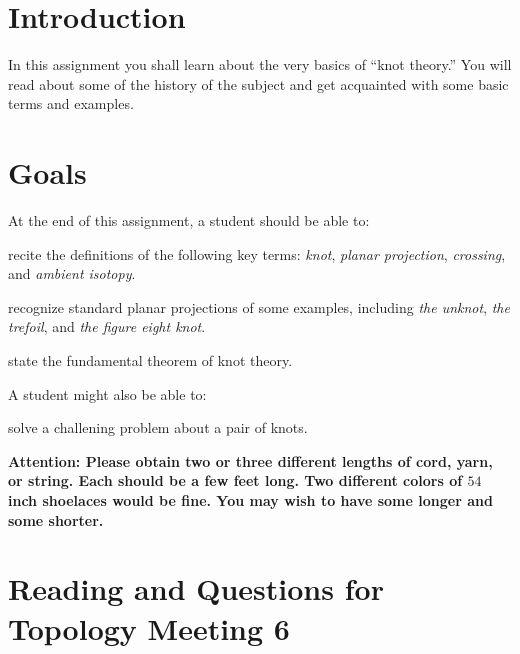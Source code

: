 \documentclass[12pt,letterpaper]{article}
\theoremstyle{definition}
\begin{document}
\setlength{\parskip}{1ex plus 0.5ex minus 0.2ex}
\setlength{\parindent}{0pt}

\pagestyle{fancy}
\cfoot{}

\section*{Introduction}
In this assignment you shall learn about the very basics of ``knot theory.''
You will read about some of the history of the subject and get acquainted with some basic terms and examples.

\section*{Goals}
At the end of this assignment, a student should be able to:
\begin{compactitem}
\item recite the definitions of the following key terms: \emph{knot}, \emph{planar projection}, \emph{crossing}, and \emph{ambient isotopy}.
\item recognize standard planar projections of some examples, including \emph{the unknot}, \emph{the trefoil}, and \emph{the figure eight knot}.
\item state the fundamental theorem of knot theory.
\end{compactitem}
A student might also be able to:
\begin{compactitem}
\item solve a challening problem about a pair of knots.
\end{compactitem}

\begin{center}
\textbf{
Attention:
Please obtain two or three different lengths of cord, yarn, or string. 
Each should be a few feet long. 
Two different colors of $54$ inch shoelaces would be fine. 
You may wish to have some longer and some shorter.
}
\end{center}

\section*{Reading and Questions for Topology Meeting 6}
\end{document}

